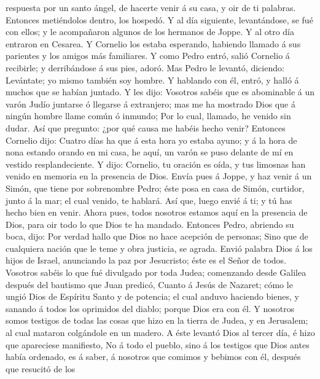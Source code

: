 respuesta por un santo ángel, de hacerte venir á su casa, y oir de ti
palabras.  Entonces metiéndolos dentro, los hospedó. Y al
día siguiente, levantándose, se fué con ellos; y le acompañaron algunos
de los hermanos de Joppe.  Y al otro día entraron en
Cesarea. Y Cornelio los estaba esperando, habiendo llamado á sus
parientes y los amigos más familiares.  Y como Pedro entró,
salió Cornelio á recibirle; y derribándose á sus pies, adoró.
 Mas Pedro le levantó, diciendo: Levántate; yo mismo
también soy hombre.  Y hablando con él, entró, y halló á
muchos que se habían juntado.  Y les dijo: Vosotros sabéis
que es abominable á un varón Judío juntarse ó llegarse á extranjero; mas
me ha mostrado Dios que á ningún hombre llame común ó inmundo;
 Por lo cual, llamado, he venido sin dudar. Así que
pregunto: ¿por qué causa me habéis hecho venir?  Entonces
Cornelio dijo: Cuatro días ha que á esta hora yo estaba ayuno; y á la
hora de nona estando orando en mi casa, he aquí, un varón se puso
delante de mí en vestido resplandeciente.  Y dijo:
Cornelio, tu oración es oída, y tus limosnas han venido en memoria en la
presencia de Dios.  Envía pues á Joppe, y haz venir á un
Simón, que tiene por sobrenombre Pedro; éste posa en casa de Simón,
curtidor, junto á la mar; el cual venido, te hablará.  Así
que, luego envié á ti; y tú has hecho bien en venir. Ahora pues, todos
nosotros estamos aquí en la presencia de Dios, para oir todo lo que Dios
te ha mandado.  Entonces Pedro, abriendo su boca, dijo: Por
verdad hallo que Dios no hace acepción de personas;  Sino
que de cualquiera nación que le teme y obra justicia, se agrada.
 Envió palabra Dios á los hijos de Israel, anunciando la
paz por Jesucristo; éste es el Señor de todos.  Vosotros
sabéis lo que fué divulgado por toda Judea; comenzando desde Galilea
después del bautismo que Juan predicó,  Cuanto á Jesús de
Nazaret; cómo le ungió Dios de Espíritu Santo y de potencia; el cual
anduvo haciendo bienes, y sanando á todos los oprimidos del diablo;
porque Dios era con él.  Y nosotros somos testigos de todas
las cosas que hizo en la tierra de Judea, y en Jerusalem; al cual
mataron colgándole en un madero.  A éste levantó Dios al
tercer día, é hizo que apareciese manifiesto,  No á todo el
pueblo, sino á los testigos que Dios antes había ordenado, es á saber, á
nosotros que comimos y bebimos con él, después que resucitó de los
